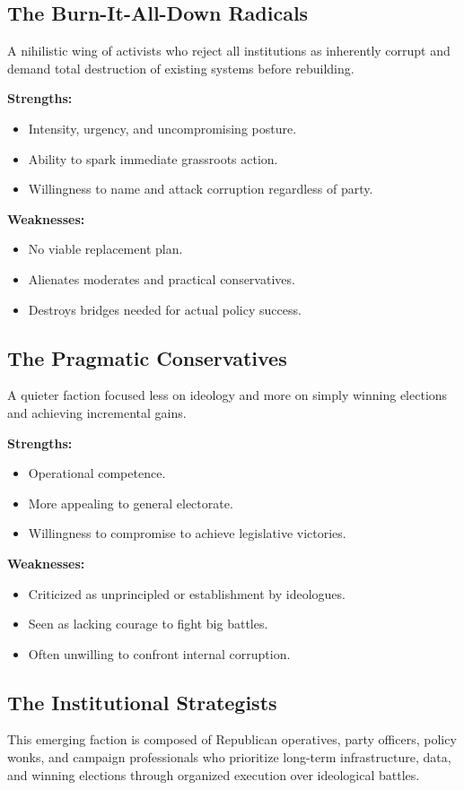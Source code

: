 \subsection{The Burn-It-All-Down Radicals}
A nihilistic wing of activists who reject all institutions as inherently corrupt and demand total destruction of existing systems before rebuilding.

\textbf{Strengths:}
\begin{itemize}
\item Intensity, urgency, and uncompromising posture.
\item Ability to spark immediate grassroots action.
\item Willingness to name and attack corruption regardless of party.
\end{itemize}

\textbf{Weaknesses:}
\begin{itemize}
\item No viable replacement plan.
\item Alienates moderates and practical conservatives.
\item Destroys bridges needed for actual policy success.
\end{itemize}

\subsection{The Pragmatic Conservatives}
A quieter faction focused less on ideology and more on simply winning elections and achieving incremental gains.

\textbf{Strengths:}
\begin{itemize}
\item Operational competence.
\item More appealing to general electorate.
\item Willingness to compromise to achieve legislative victories.
\end{itemize}

\textbf{Weaknesses:}
\begin{itemize}
\item Criticized as unprincipled or establishment by ideologues.
\item Seen as lacking courage to fight big battles.
\item Often unwilling to confront internal corruption.
\end{itemize}

\subsection{The Institutional Strategists}
This emerging faction is composed of Republican operatives, party officers, policy wonks, and campaign professionals who prioritize long-term infrastructure, data, and winning elections through organized execution over ideological battles.

